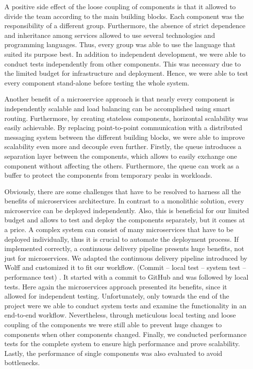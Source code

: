 A positive side effect of the loose coupling of components is that it
allowed to divide the team according to the main building blocks. Each
component was the responsibility of a different group. Furthermore, the
absence of strict dependence and inheritance among services allowed to
use several technologies and programming languages. Thus, every group
was able to use the language that suited its purpose best. In addition
to independent development, we were able to conduct tests independently
from other components. This was necessary due to the limited budget for
infrastructure and deployment. Hence, we were able to test every
component stand-alone before testing the whole system.

Another benefit of a microservice approach is that nearly every
component is independently scalable and load balancing can be
accomplished using smart routing. Furthermore, by creating stateless
components, horizontal scalability was easily achievable. By replacing
point-to-point communication with a distributed messaging system between
the different building blocks, we were able to improve scalability even
more and decouple even further. Firstly, the queue introduces a
separation layer between the components, which allows to easily exchange
one component without affecting the others. Furthermore, the queue can
work as a buffer to protect the components from temporary peaks in
workloads.

Obviously, there are some challenges that have to be resolved to harness
all the benefits of microservices architecture. In contrast to a
monolithic solution, every microservice can be deployed independently.
Also, this is beneficial for our limited budget and allows to test and
deploy the components separately, but it comes at a price. A complex system
can consist of many microservices that have to be deployed individually,
thus it is crucial to automate the deployment process. If implemented
correctly, a continuous delivery pipeline presents huge benefits, not
just for microservices. We adapted the continuous delivery pipeline
introduced by Wolff and customized it to fit our workflow.
(Commit -- local test -- system test -- performance test) \cite{Wolff.2016}.
It started with a commit to GitHub and was followed by local tests.
Here again the microservices approach presented its benefits, since it allowed
for independent testing. Unfortunately, only towards the end of the project
were we able to conduct system tests and examine the functionality in an
end-to-end workflow. Nevertheless, through meticulous local testing and loose
coupling of the components we were still able to prevent huge changes to
components when other components changed. Finally, we conducted performance
tests for the complete system to ensure high performance and prove scalability.
Lastly, the performance of single components was also evaluated to avoid
bottlenecks.

